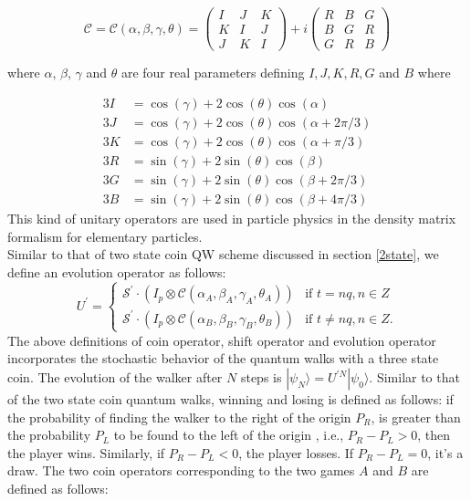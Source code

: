 \documentclass[english,aps,pra,amsmath,amssymb,showpacs,notitlepage,onecolumn]{revtex4-1}
\begin{document}
\begin{equation}
\mathcal{C}=\mathcal{C}(\alpha, \beta, \gamma, \theta)=\left(  \begin{array}{ccc}
I & J & K \\ 
K & I & J \\ 
J & K & I 
\end{array} \right) + i\left(  \begin{array}{ccc}
R & B & G \\ 
B & G & R \\ 
G & R & B 
\end{array} \right)
\end{equation}


where $\alpha$, $\beta$, $\gamma$ and $\theta$ are four real parameters defining $I, J, K, R, G$ and $B$ where

\begin{equation}
\begin{array}{ll}
3I &= \cos(\gamma) + 2\cos(\theta)\cos(\alpha) \\
3J &= \cos(\gamma) + 2\cos(\theta)\cos(\alpha + 2\pi/3)\\
3K &= \cos(\gamma) + 2\cos(\theta)\cos(\alpha + \pi/3) \\
3R &= \sin(\gamma) + 2\sin(\theta)\cos(\beta) \\
3G &= \sin(\gamma) + 2\sin(\theta)\cos(\beta + 2\pi/3) \\
3B &= \sin(\gamma) + 2\sin(\theta)\cos(\beta + 4\pi/3) 
\end{array}
\end{equation}
This kind of unitary operators are used in particle physics in the density matrix formalism for elementary particles\cite{particle_phy}.\\

Similar to that of two state coin QW scheme discussed in section \ref{2state}, we define an evolution operator as follows:
\begin{equation}
U^{\prime} =\left\lbrace 
	\begin{array}{ll}
		\mathcal{S^{\prime}}\cdot (I_p \otimes \mathcal{C}(\alpha_A, \beta_A, \gamma_A, \theta_A))  & \mbox{if } t=nq,n\in Z \\
		\mathcal{S^{\prime}}\cdot (I_p \otimes \mathcal{C}(\alpha_B, \beta_B, \gamma_B, \theta_B))  & \mbox{if } t\neq nq,n\in Z.
	\end{array}
\right.  
\end{equation}
The above definitions of coin operator, shift operator and evolution operator incorporates the stochastic behavior of the quantum walks with a three state coin. The evolution of the walker after $N$ steps is $|\psi_N\rangle = U^{\prime N}|\psi_0\rangle$. Similar to that of the two state coin quantum walks, winning and losing is defined as follows: if the probability of finding the walker to the right of the origin $P_{R}$, is greater than the probability $P_{L}$ to be found to the left of the origin , i.e., $P_{R}-P_{L}>0$, then the player wins. Similarly, if $P_{R}-P_{L}<0$, the player losses. If $P_{R}-P_{L}=0$, it's a draw. The two coin operators corresponding to the two games $A$ and $B$ are defined as follows:
\end{document}
